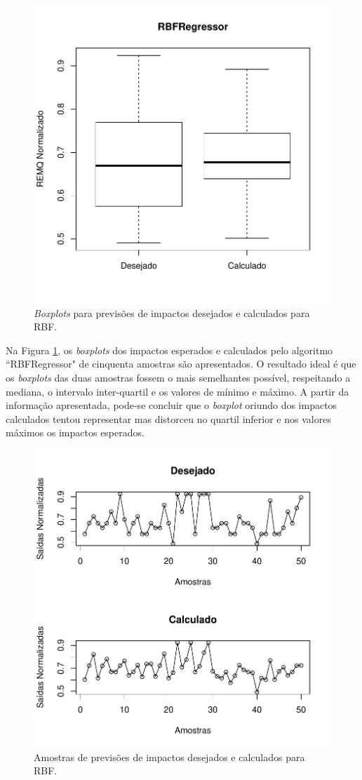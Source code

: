 \begin{figure}[!h]
  \vspace{-0.2cm}
  \centering
  \includegraphics[trim = 1mm 12mm 1mm 1mm,clip,width=0.7\columnwidth]{image/rbfreg_ex4.pdf}
  \caption{\textit{Boxplots} para previsões de impactos desejados e calculados para RBF.}
  \label{fig:anns_result_3}
\end{figure}

Na Figura \ref{fig:anns_result_3}, os \textit{boxplots} dos impactos esperados e calculados pelo algoritmo ``RBFRegressor" de cinquenta amostras são apresentados. O resultado ideal é que os \textit{boxplots} das duas amostras fossem o mais semelhantes possível, respeitando a mediana, o intervalo inter-quartil e os valores de mínimo e máximo. A partir da informação apresentada, pode-se concluir que o \textit{boxplot} oriundo dos impactos calculados tentou representar mas distorceu no quartil inferior e nos valores máximos os impactos esperados.

\begin{figure}[!h]
  \vspace{-0.2cm}
  \centering
  \includegraphics[width=0.7\columnwidth]{image/rbfreg_ex4_2.pdf}
  \caption{Amostras de previsões de impactos desejados e calculados para RBF.}
  \label{fig:anns_result_4}
\end{figure}

